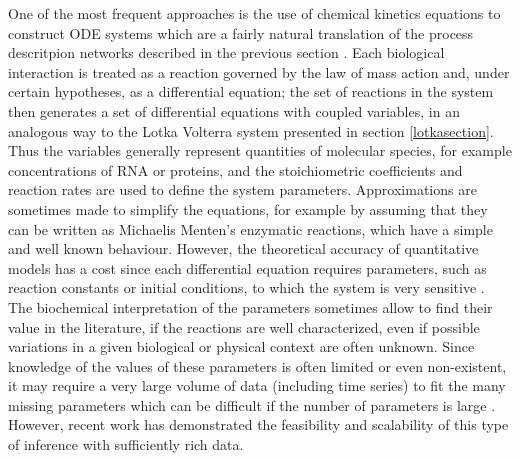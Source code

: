 \documentclass[a4paper,12pt,twoside,onecolumn,openright,final,oldfontcommands]{memoir}
\begin{document}
One of the most frequent approaches is the use of chemical kinetics
equations to construct ODE systems which are a fairly natural
translation of the process descritpion networks described in the
previous section \citep{polynikis2009comparing}. Each biological
interaction is treated as a reaction governed by the law of mass action
and, under certain hypotheses, as a differential equation; the set of
reactions in the system then generates a set of differential equations
with coupled variables, in an analogous way to the Lotka Volterra system
presented in section \ref{lotkasection}. Thus the variables generally
represent quantities of molecular species, for example concentrations of
RNA or proteins, and the stoichiometric coefficients and reaction rates
are used to define the system parameters. Approximations are sometimes
made to simplify the equations, for example by assuming that they can be
written as Michaelis Menten's enzymatic reactions, which have a simple
and well known behaviour. However, the theoretical accuracy of
quantitative models has a cost since each differential equation requires
parameters, such as reaction constants or initial conditions, to which
the system is very sensitive \citep{le2015quantitative}. The biochemical
interpretation of the parameters sometimes allow to find their value in
the literature, if the reactions are well characterized, even if
possible variations in a given biological or physical context are often
unknown. Since knowledge of the values of these parameters is often
limited or even non-existent, it may require a very large volume of data
(including time series) to fit the many missing parameters which can be
difficult if the number of parameters is large
\citep{villaverde2014reverse}. However, recent work has demonstrated the
feasibility and scalability of this type of inference with sufficiently
rich data. \citep{frohlich2018efficient}
\end{document}
